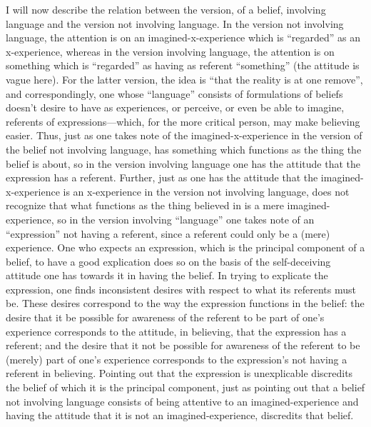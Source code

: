  I will now describe the relation between the 
version, of a belief, involving language and the version not involving 
language. In the version not involving language, the attention is on an 
imagined-x-experience which is \enquote{regarded} as an x-experience, whereas in 
the version involving language, the attention is on something which is 
\enquote{regarded} as having as referent \enquote{something} (the attitude is vague here). 
For the latter version, the idea is \enquote{that the reality is at one remove}, and 
correspondingly, one whose \enquote{language} consists of formulations of beliefs 
doesn't desire to have as experiences, or perceive, or even be able to imagine, 
referents of expressions---which, for the more critical person, may make 
believing easier. Thus, just as one takes note of the imagined-x-experience in 
the version of the belief not involving language, has something which 
functions as the thing the belief is about, so in the version involving language 
one has the attitude that the expression has a referent. Further, just as one 
has the attitude that the imagined-x-experience is an x-experience in the 
version not involving language, does not recognize that what functions as the 
thing believed in is a mere imagined-experience, so in the version involving 
\enquote{language} one takes note of an \enquote{expression} not having a referent, since a 
referent could only be a (mere) experience. One who expects an expression, 
which is the principal component of a belief, to have a good explication does 
so on the basis of the self-deceiving attitude one has towards it in having the 
belief. In trying to explicate the expression, one finds inconsistent desires 
with respect to what its referents must be. These desires correspond to the 
way the expression functions in the belief: the desire that it be possible for 
awareness of the referent to be part of one's experience corresponds to the 
attitude, in believing, that the expression has a referent; and the desire that it 
not be possible for awareness of the referent to be (merely) part of one's 
experience corresponds to the expression's not having a referent in believing. 
Pointing out that the expression is unexplicable discredits the belief of which 
it is the principal component, just as pointing out that a belief not involving 
language consists of being attentive to an imagined-experience and having the 
attitude that it is not an imagined-experience, discredits that belief. 

